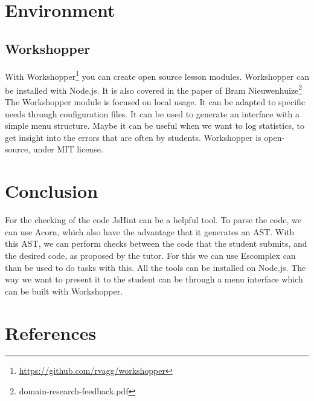 \documentclass{article}
\begin{document}
\section{Environment}
\subsection{Workshopper}
With Workshopper\footnote{\url{https://github.com/rvagg/workshopper}} you can create open source lesson modules.
Workshopper can be installed with Node.js.
It is also covered in the paper of Bram Nieuwenhuize\footnote{domain-research-feedback.pdf}
The Workshopper module is focused on local usage. It can be adapted to specific needs through configuration files.
It can be used to generate an interface with a simple menu structure.
Maybe it can be useful when we want to log statistics, to get insight into the errors that are often by students.
Workshopper is open-source, under MIT license.

\section{Conclusion}
For the checking of the code JsHint can be a helpful tool.
To parse the code, we can use Acorn, which also have the advantage that it generates an AST. 
With this AST, we can perform checks between the code that the student submits, and the desired code, as proposed by the tutor.
For this we can use Escomplex can than be used to do tasks with this.
All the tools can be installed on Node.js.
The way we want to present it to the student can be through a menu interface which can be built with Workshopper.

\section{References}
\end{document}
